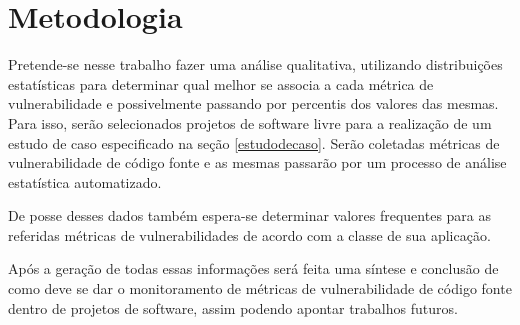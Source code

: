 \chapter{Metodologia}

Pretende-se nesse trabalho fazer uma análise qualitativa, utilizando distribuições estatísticas para determinar qual melhor
se associa a cada métrica de vulnerabilidade e possivelmente passando por percentis dos valores das mesmas. Para isso, serão
selecionados projetos de software livre para a realização de um estudo de caso especificado na seção \ref{estudodecaso}.
Serão coletadas métricas de vulnerabilidade de código fonte e as mesmas passarão por um processo de análise estatística
automatizado. 

De posse desses dados também espera-se determinar valores frequentes para as referidas métricas de vulnerabilidades de acordo
com a classe de sua aplicação.

Após a geração de todas essas informações será feita uma síntese e conclusão de como deve se dar o monitoramento de métricas de 
vulnerabilidade de código fonte dentro de projetos de software, assim podendo apontar trabalhos futuros.
